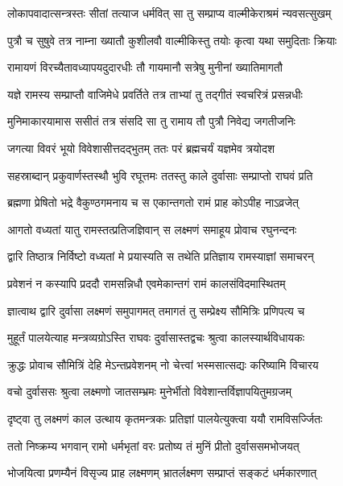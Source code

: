\twolineshloka
{लोकापवादात्सन्त्रस्तः सीतां तत्याज धर्मवित्}
{सा तु सम्प्राप्य वाल्मीकेराश्रमं न्यवसत्सुखम्}%

\twolineshloka
{पुत्रौ च सुषुवे तत्र नाम्ना ख्यातौ कुशीलवौ}
{वाल्मीकिस्तु तयोः कृत्वा यथा समुदिताः क्रियाः}%

\twolineshloka
{रामायणं विरच्यैतावध्यापयदुदारधीः}
{तौ गायमानौ सत्रेषु मुनीनां ख्यातिमागतौ}%

\twolineshloka
{यज्ञे रामस्य सम्प्राप्तौ वाजिमेधे प्रवर्तिते}
{तत्र ताभ्यां तु तद्गीतं स्वचरित्रं प्रसन्नधीः}%

\twolineshloka
{मुनिमाकारयामास ससीतं तत्र संसदि}
{सा तु रामाय तौ पुत्रौ निवेद्य जगतीजनिः}%

\twolineshloka
{जगत्या विवरं भूयो विवेशासीत्तदद्भुतम्}
{ततः परं ब्रह्मचर्यं यज्ञमेव त्रयोदश}%

\twolineshloka
{सहस्राब्दान् प्रकुवार्णस्तस्थौ भुवि रघूत्तमः}
{ततस्तु काले दुर्वासाः सम्प्राप्तो राघवं प्रति}%

\twolineshloka
{ब्रह्मणा प्रेषितो भद्रे वैकुण्ठगमनाय च}
{स एकान्तगतो रामं प्राह कोऽपीह नाऽव्रजेत्}%

\twolineshloka
{आगतो वध्यतां यातु रामस्तत्प्रतिजज्ञिवान्}
{स लक्ष्मणं समाहूय प्रोवाच रघुनन्दनः}%

\twolineshloka
{द्वारि तिष्ठात्र निर्विष्टो वध्यतां मे प्रयास्यति}
{स तथेति प्रतिज्ञाय रामस्याज्ञां समाचरन्}%

\twolineshloka
{प्रवेशनं न कस्यापि प्रददौ रामसन्निधौ}
{एवमेकान्तगं रामं कालसंविदमास्थितम्}%

\twolineshloka
{ज्ञात्वाथ द्वारि दुर्वासा लक्ष्मणं समुपागमत्}
{तमागतं तु सम्प्रेक्ष्य सौमित्रिः प्रणिपत्य च}%

\twolineshloka
{मुहूर्तं पालयेत्याह मन्त्रव्यग्रोऽस्ति राघवः}
{दुर्वासास्तद्वचः श्रुत्वा कालस्यार्थविधायकः}%

\twolineshloka
{क्रुद्धः प्रोवाच सौमित्रिं देहि मेऽन्तप्रवेशनम्}
{नो चेत्त्वां भस्मसात्सद्यः करिष्यामि विचारय}%

\twolineshloka
{वचो दुर्वाससः श्रुत्वा लक्ष्मणो जातसम्भ्रमः}
{मुनेर्भीतो विवेशान्तर्विज्ञापयितुमग्रजम्}%

\twolineshloka
{दृष्ट्वा तु लक्ष्मणं काल उत्थाय कृतमन्त्रकः}
{प्रतिज्ञां पालयेत्युक्त्वा ययौ रामविसर्ज्जितः}%

\twolineshloka
{ततो निष्क्रम्य भगवान् रामो धर्मभृतां वरः}
{प्रतोष्य तं मुनिं प्रीतो दुर्वाससमभोजयत्}%

\twolineshloka
{भोजयित्वा प्रणम्यैनं विसृज्य प्राह लक्ष्मणम्}
{भ्रातर्लक्ष्मण सम्प्राप्तं सङ्कटं धर्मकारणात्}%

